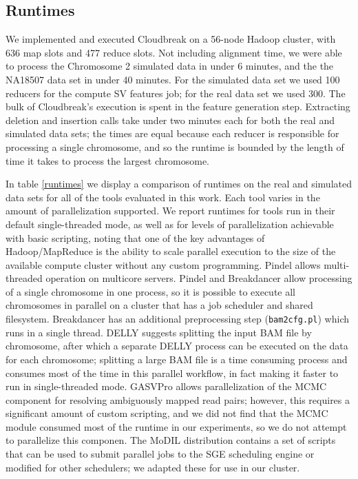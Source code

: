 \documentclass[11pt]{article}
\begin{document}
\subsection{Runtimes}

We implemented and executed Cloudbreak on a 56-node Hadoop cluster, with 636 map slots and 477 reduce slots. Not including alignment time, we were able to process the Chromosome 2 simulated data in under 6 minutes, and the the NA18507 data set in under 40 minutes. For the simulated data set we used 100 reducers for the compute SV features job; for the real data set we used 300. The bulk of Cloudbreak's execution is spent in the feature generation step. Extracting deletion and insertion calls take under two minutes each for both the real and simulated data sets; the times are equal because each reducer is responsible for processing a single chromosome, and so the runtime is bounded by the length of time it takes to process the largest chromosome. 

In table \ref{runtimes} we display a comparison of runtimes on the real and simulated data sets for all of the tools evaluated in this work. Each tool varies in the amount of parallelization supported. We report runtimes for tools run in their default single-threaded mode, as well as for levels of parallelization achievable with basic scripting, noting that one of the key advantages of Hadoop/MapReduce is the ability to scale parallel execution to the size of the available compute cluster without any custom programming. Pindel allows multi-threaded operation on multicore servers. Pindel and Breakdancer allow processing of a single chromosome in one process, so it is possible to execute all chromosomes in parallel on a cluster that has a job scheduler and shared filesystem. Breakdancer has an additional preprocessing step (\texttt{bam2cfg.pl}) which runs in a single thread. DELLY suggests splitting the input BAM file by chromosome, after which a separate DELLY process can be executed on the data for each chromosome; splitting a large BAM file is a time consuming process and consumes most of the time in this parallel workflow, in fact making it faster to run in single-threaded mode. GASVPro allows parallelization of the MCMC component for resolving ambiguously mapped read pairs; however, this requires a significant amount of custom scripting, and we did not find that the MCMC module consumed most of the runtime in our experiments, so we do not attempt to parallelize this componen. The MoDIL distribution contains a set of scripts that can be used to submit parallel jobs to the SGE scheduling engine or modified for other schedulers; we adapted these for use in our cluster.
\end{document}
